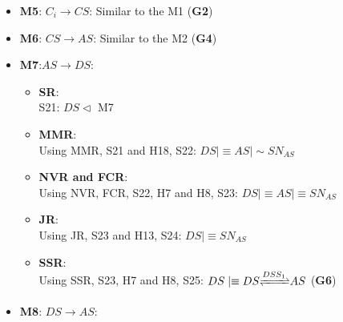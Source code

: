 \documentclass[journal,article,submit,moreauthors,pdftex]{Definitions/mdpi}
\begin{document}
\begin{itemize}
\begin{itemize} [topsep=0pt,itemsep=-1ex,partopsep=1ex,parsep=1ex]
\begin{itemize}[topsep=0pt,itemsep=-1ex,partopsep=1ex,parsep=1ex]
                                     Using NVR, FCR, S17, H3 and H4, S18: $C_i \mid\equiv CS \mid\equiv SN_{C}$
                                     \item \textbf{JR}:\\
                                     Using JR, S18 and H11, S19: $C_i \mid\equiv SN_{C}$
                                     \item \textbf{SSR}:\\
                                     Using SSR, S18, H3 and H4, S20: $C_i\mid\equiv C_i {\xrightleftharpoons{C_iS_3}} CS$ (\textbf{G1})
                                    \end{itemize}
     \item \textbf{M5}: $C_i \rightarrow CS$: Similar to the M1 (\textbf{G2})
     \item \textbf{M6}: $CS \rightarrow AS$: Similar to the M2 (\textbf{G4})
     \item \textbf{M7}:$AS \rightarrow DS$:
                                    \begin{itemize}[topsep=0pt,itemsep=-1ex,partopsep=1ex,parsep=1ex]
                                    \item \textbf{SR}:\\
                                    S21: $DS \lhd$ M7
                                    \item \textbf{MMR}:\\
                                    Using MMR, S21 and H18, S22: $DS \mid\equiv AS \mid \sim SN_{AS}$
                                    \item \textbf{NVR and FCR}:\\
                                     Using NVR, FCR, S22, H7 and H8, S23: $DS \mid\equiv AS \mid\equiv SN_{AS}$
                                     \item \textbf{JR}:\\
                                     Using JR, S23 and H13, S24: $DS \mid\equiv SN_{AS}$
                                     \item \textbf{SSR}:\\
                                     Using SSR, S23, H7 and H8, S25: $DS\mid\equiv DS {\xrightleftharpoons{DSS_1}} AS$ (\textbf{G6})
                                    \end{itemize}
     \item \textbf{M8}: $DS \rightarrow AS$:
                                    \begin{itemize}[topsep=0pt,itemsep=-1ex,partopsep=1ex,parsep=1ex]

\end{itemize}
\end{itemize}
\end{itemize}
\end{document}
